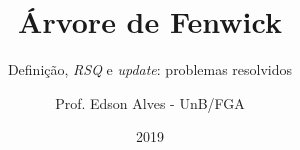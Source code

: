 \title{Árvore de Fenwick}
\subtitle{Definição, \textit{RSQ} e \textit{update}: problemas resolvidos}
\author{Prof. Edson Alves - UnB/FGA}
\date{2019}
